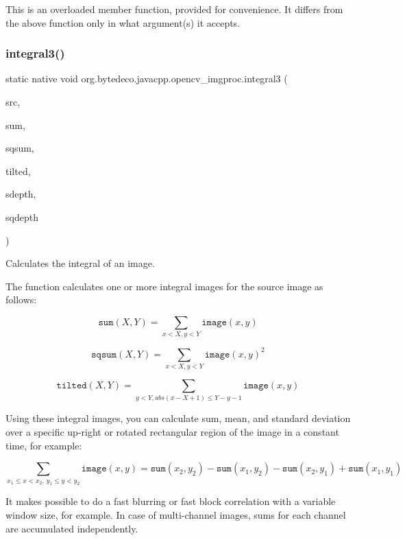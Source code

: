 This is an overloaded member function, provided for convenience. It differs from the above function only in what argument(s) it accepts. \mbox{\label{group__imgproc__misc_gaac16fc19a4025e3133ded033405c8e25}} 
\subsubsection{\texorpdfstring{integral3()}{integral3()}}
{\footnotesize\ttfamily static native void org.\+bytedeco.\+javacpp.\+opencv\+\_\+imgproc.\+integral3 (\begin{DoxyParamCaption}\item[{@By\+Val Mat}]{src,  }\item[{@By\+Val Mat}]{sum,  }\item[{@By\+Val Mat}]{sqsum,  }\item[{@By\+Val Mat}]{tilted,  }\item[{int}]{sdepth,  }\item[{int}]{sqdepth }\end{DoxyParamCaption})\hspace{0.3cm}{\ttfamily [static]}}



Calculates the integral of an image. 

The function calculates one or more integral images for the source image as follows\+: 

\[\texttt{sum} (X,Y) = \sum _{x<X,y<Y} \texttt{image} (x,y)\] 

\[\texttt{sqsum} (X,Y) = \sum _{x<X,y<Y} \texttt{image} (x,y)^2\] 

\[\texttt{tilted} (X,Y) = \sum _{y<Y,abs(x-X+1) \leq Y-y-1} \texttt{image} (x,y)\] 

Using these integral images, you can calculate sum, mean, and standard deviation over a specific up-\/right or rotated rectangular region of the image in a constant time, for example\+: 

\[\sum _{x_1 \leq x < x_2, \, y_1 \leq y < y_2} \texttt{image} (x,y) = \texttt{sum} (x_2,y_2)- \texttt{sum} (x_1,y_2)- \texttt{sum} (x_2,y_1)+ \texttt{sum} (x_1,y_1)\] 

It makes possible to do a fast blurring or fast block correlation with a variable window size, for example. In case of multi-\/channel images, sums for each channel are accumulated independently. 

